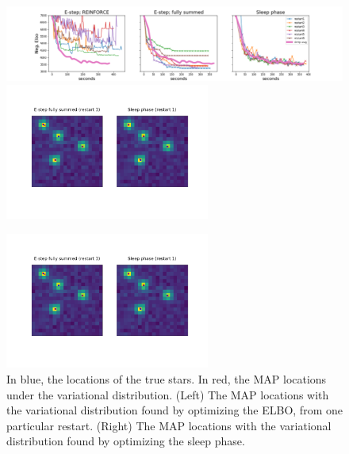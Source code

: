 \begin{figure}[!ht]
    \centering
    \includegraphics[width = \textwidth]{figures/optim_path_compare.png}
    \includegraphics[width = 0.6\textwidth]{figures/optim_path_detect_compare.png}
    \caption{ }
    \label{fig:optim_path}
\end{figure}

\begin{figure}[!ht]
    \centering
    \includegraphics[width = 0.6\textwidth]{figures/optim_path_detect_compare.png}
    \vspace{-1.5em}
    \caption{In blue, the locations of the true stars. In red, the MAP locations under the variational distribution. (Left) The MAP locations with the variational distribution found by optimizing the ELBO, from one particular restart. (Right) The MAP locations with the variational distribution found by optimizing the sleep phase. }
    \label{fig:compare_elbo_sleep_toy_example}
\end{figure}
